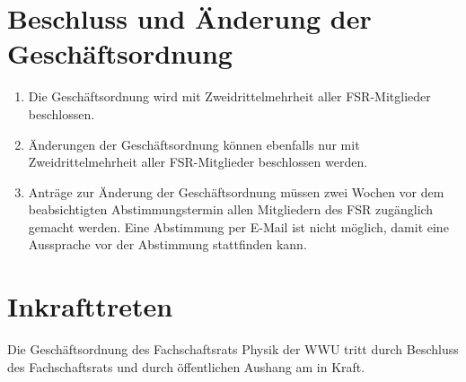 \documentclass[
	a4paper,
	12pt,
	oneside,
	parskip=half-,
	pagesize,
	headsepline,
	german,
	ngerman
]{scrartcl}
\begin{document}
\section{Beschluss und Änderung der Geschäftsordnung} \label{sec:GO-Änderung}
\begin{enumerate}
	\item Die Geschäftsordnung wird mit Zweidrittelmehrheit aller FSR-Mitglieder beschlossen.
	\item Änderungen der Geschäftsordnung können ebenfalls nur mit Zweidrittelmehrheit aller FSR-Mitglieder beschlossen werden.
	\item Anträge zur Änderung der Geschäftsordnung müssen zwei Wochen vor dem beabsichtigten Abstimmungstermin allen Mitgliedern des FSR zugänglich gemacht werden. Eine Abstimmung per E-Mail ist nicht möglich, damit eine Aussprache vor der Abstimmung stattfinden kann.
\end{enumerate}

\section{Inkrafttreten}
Die Geschäftsordnung des Fachschaftsrats Physik der WWU tritt durch Beschluss des Fachschaftsrats und durch öffentlichen Aushang am  in Kraft.


\end{document}
